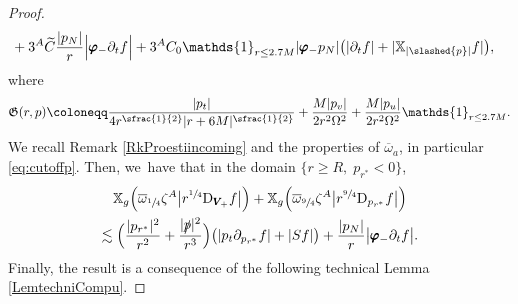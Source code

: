 \documentclass[JEP,XML,SOM,Unicode,published]{cedram}
\theoremstyle{plain}
\theoremstyle{definition}
\newcommand\z{{\zeta}}
\newcommand\T{{\mathbb{X}}}
\begin{document}
\begin{proof}
\begin{align*}
& + 3^A \widetilde{C}\frac{|p_N|}{ r} \Big| \pmb{\varphi}_- \partial_t f \Big|+3^AC_0 \mathds{1}_{r \leq 2.7M} | \pmb{\varphi}_- p_N| \bigl(|\partial_t f | + |\T_{|\slashed{p}|} f | \bigr),
\end{align*}
where\vspace*{-5pt}
\begin{equation}\label{eq:DefCalG}
\mathfrak{G}(r,p) \coloneqq \frac{|p_t|}{4r^{\sfrac{1}{2}}|r+6M|^{\sfrac{1}{2}} }+\frac{M|p_v|}{2r^2 \Omega^2}+ \frac{M|p_u|}{2r^2 \Omega^2} \mathds{1}_{r \leq 2.7M}.
\end{equation}
We recall Remark \ref{RkProestiincoming} and the properties of $\overline{\omega}_a$, in particular \eqref{eq:cutoffp}. Then, we~have that in the domain $\{ r \geq R, \; p_{r^*} <0 \}$,\vspace*{-5pt}
\begin{multline*}
\T_g \Bigl(\overline{\omega}_{\sfrac{1}{4}} \z^A\big|r^{\sfrac{1}{4}} \mathrm{D}_{\pmb{V}_{\! +}} f \big| \Bigr) + \T_g \Bigl(\overline{\omega}_{\sfrac{9}{4}} \z^A \big| r^{\sfrac{9}{4}} \mathrm{D }_{p_{r^*}} f \big| \Bigr)\\
 \lesssim \Bigl(\frac{|p_{r^*}|^2}{r^2}+\frac{|\slashed{p}|^2}{r^3 } \Bigr) \bigl(|p_t \partial_{p_{r^*}} f| + |Sf| \bigr)
+\frac{|p_N|}{ r} \big| \pmb{\varphi}_- \partial_tf \big|.
\end{multline*}
Finally, the result is a consequence of the following technical Lemma \ref{LemtechniCompu}.
\end{proof}
\end{document}
